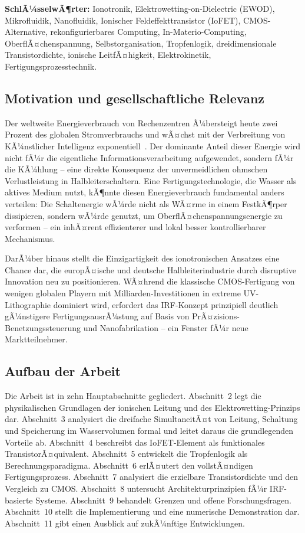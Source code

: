 ﻿\documentclass[a4paper,12pt]{scrreprt}
\theoremstyle{definition}
\begin{document}
\textbf{SchlÃ¼sselwÃ¶rter:} Ionotronik, Elektrowetting-on-Dielectric (EWOD),
Mikrofluidik, Nanofluidik, Ionischer Feldeffekttransistor (IoFET), CMOS-Alternative,
rekonfigurierbares Computing, In-Materio-Computing, OberflÃ¤chenspannung,
Selbstorganisation, Tropfenlogik, dreidimensionale Transistordichte,
ionische LeitfÃ¤higkeit, Elektrokinetik, Fertigungsprozesstechnik.

\subsection{Motivation und gesellschaftliche Relevanz}

Der weltweite Energieverbrauch von Rechenzentren Ã¼bersteigt heute zwei Prozent
des globalen Stromverbrauchs und wÃ¤chst mit der Verbreitung von
KÃ¼nstlicher Intelligenz exponentiell~\cite{iea2023}. Der dominante Anteil
dieser Energie wird nicht fÃ¼r die eigentliche Informationsverarbeitung
aufgewendet, sondern fÃ¼r die KÃ¼hlung -- eine direkte Konsequenz der
unvermeidlichen ohmschen Verlustleistung in Halbleiterschaltern. Eine
Fertigungstechnologie, die Wasser als aktives Medium nutzt, kÃ¶nnte
diesen Energieverbrauch fundamental anders verteilen: Die Schaltenergie
wÃ¼rde nicht als WÃ¤rme in einem FestkÃ¶rper dissipieren, sondern wÃ¼rde
genutzt, um OberflÃ¤chenspannungsenergie zu verformen -- ein inhÃ¤rent
effizienterer und lokal besser kontrollierbarer Mechanismus.

DarÃ¼ber hinaus stellt die Einzigartigkeit des ionotronischen Ansatzes
eine Chance dar, die europÃ¤ische und deutsche Halbleiterindustrie durch
disruptive Innovation neu zu positionieren. WÃ¤hrend die klassische
CMOS-Fertigung von wenigen globalen Playern mit Milliarden-Investitionen
in extreme UV-Lithographie dominiert wird, erfordert das IRF-Konzept
prinzipiell deutlich gÃ¼nstigere FertigungsausrÃ¼stung auf Basis von
PrÃ¤zisions-Benetzungssteuerung und Nanofabrikation -- ein Fenster fÃ¼r
neue Marktteilnehmer.

\subsection{Aufbau der Arbeit}

Die Arbeit ist in zehn Hauptabschnitte gegliedert. Abschnitt~2 legt die
physikalischen Grundlagen der ionischen Leitung und des Elektrowetting-Prinzips
dar. Abschnitt~3 analysiert die dreifache SimultaneitÃ¤t von Leitung, Schaltung
und Speicherung im Wasservolumen formal und leitet daraus die grundlegenden
Vorteile ab. Abschnitt~4 beschreibt das IoFET-Element als funktionales
TransistorÃ¤quivalent. Abschnitt~5 entwickelt die Tropfenlogik als
Berechnungsparadigma. Abschnitt~6 erlÃ¤utert den vollstÃ¤ndigen Fertigungsprozess.
Abschnitt~7 analysiert die erzielbare Transistordichte und den Vergleich
zu CMOS. Abschnitt~8 untersucht Architekturprinzipien fÃ¼r IRF-basierte
Systeme. Abschnitt~9 behandelt Grenzen und offene Forschungsfragen. Abschnitt~10 stellt die Implementierung und eine numerische Demonstration dar. Abschnitt~11 gibt einen Ausblick auf zukÃ¼nftige Entwicklungen.
\end{document}
